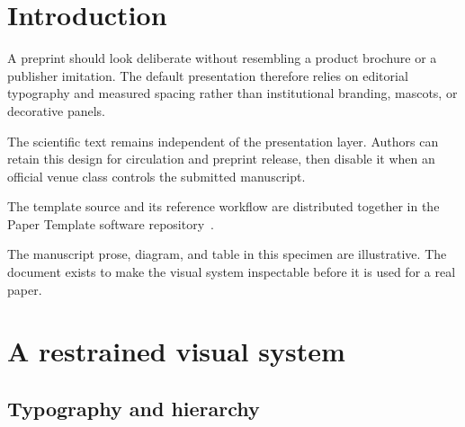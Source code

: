 \documentclass[11pt]{article}
\title{\papertitle}
\author{\paperauthors}
\date{\paperdate}
\begin{document}
\maketitle

\begin{abstract}
This document demonstrates the standalone preprint presentation supplied with the PaperTemplate repository.
The design uses a compact title block, a visible repository link, an integrated abstract, and restrained running elements.
It keeps figures and tables visually prominent while preserving a conventional single-column reading experience.
The accompanying repository separates manuscript content, evidence, computation, and venue adaptation so each layer remains reviewable.
\paperkeywordsblock
\end{abstract}

\paperstartmaintext

\section{Introduction}

A preprint should look deliberate without resembling a product brochure or a publisher imitation.
The default presentation therefore relies on editorial typography and measured spacing rather than institutional branding, mascots, or decorative panels.

The scientific text remains independent of the presentation layer.
Authors can retain this design for circulation and preprint release, then disable it when an official venue class controls the submitted manuscript.

The template source and its reference workflow are distributed together in the Paper Template software repository~\citep{schmiedmayer2026papertemplate}.

The manuscript prose, diagram, and table in this specimen are illustrative.
The document exists to make the visual system inspectable before it is used for a real paper.

\section{A restrained visual system}

\subsection{Typography and hierarchy}
\end{document}
